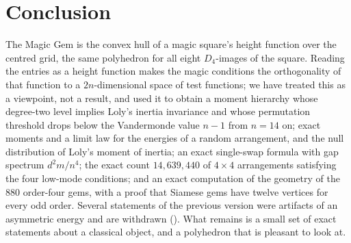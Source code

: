 \section{Conclusion}
\label{sec:conclusion}

The Magic Gem is the convex hull of a magic square's height function over the centred grid, the same polyhedron for all eight $D_4$-images of the square.
Reading the entries as a height function makes the magic conditions the orthogonality of that function to a $2n$-dimensional space of test functions; we have treated this as a viewpoint, not a result, and used it to obtain a moment hierarchy whose degree-two level implies Loly's inertia invariance and whose permutation threshold drops below the Vandermonde value $n-1$ from $n=14$ on; exact moments and a limit law for the energies of a random arrangement, and the null distribution of Loly's moment of inertia; an exact single-swap formula with gap spectrum $d^2m/n^4$; the exact count $14{,}639{,}440$ of $4\times4$ arrangements satisfying the four low-mode conditions; and an exact computation of the geometry of the $880$ order-four gems, with a proof that Siamese gems have twelve vertices for every odd order.
Several statements of the previous version were artifacts of an asymmetric energy and are withdrawn ().
What remains is a small set of exact statements about a classical object, and a polyhedron that is pleasant to look at.
